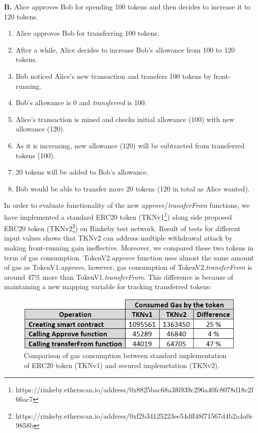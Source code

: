 \noindent \textbf{B.} Alice approves Bob for spending 100 tokens and then decides to increase it to 120 tokens.
\begin{enumerate}
	\item Alice approves Bob for transferring 100 tokens.
	\item After a while, Alice decides to increase Bob’s allowance from 100 to 120 tokens.
	\item Bob noticed Alice’s new transaction and transfers 100 tokens by front-running.
	\item Bob’s allowance is 0 and \textit{transferred} is 100.
	\item Alice’s transaction is mined and checks initial allowance (100) with new allowance (120).
	\item As it is increasing, new allowance (120) will be subtracted from transferred tokens (100).
	\item 20 tokens will be added to Bob’s allowance.
	\item Bob would be able to transfer more 20 tokens (120 in total as Alice wanted).\newline
\end{enumerate}
\noindent In order to evaluate functionality of the new \textit{approve}/\textit{transferFrom} functions, we have implemented a standard ERC20 token (TKNv1\footnote{https://rinkeby.etherscan.io/address/0x8825bac68a3f6939c296a40fc8078\newline d18c2f66ac7}) along side proposed ERC20 token (TKNv2\footnote{https://rinkeby.etherscan.io/address/0xf2b34125223ee54dff48f71567d4b\newline 2a4a0c9858b}) on Rinkeby test network. Result of tests for different input values shows that TKNv2 can address multiple withdrawal attack by making front-running gain ineffective. Moreover, we compared these two tokens in term of gas consumption. TokenV2.\textit{approve} function uses almost the same amount of gas as TokenV1.\textit{approve}, however, gas consumption of TokenV2.\textit{transferFrom} is around 47\% more than TokenV1.\textit{transferFrom}. This difference is because of maintaining a new mapping variable for tracking transferred tokens:
\begin{figure}[H]
	\centering
	\includegraphics[width=1.0\linewidth]{figures/multiple_withdrawal_22.png}
	\caption{Comparison of gas consumption between standard implementation of ERC20 token (TKNv1) and secured implemetation (TKNv2).}
\end{figure}
